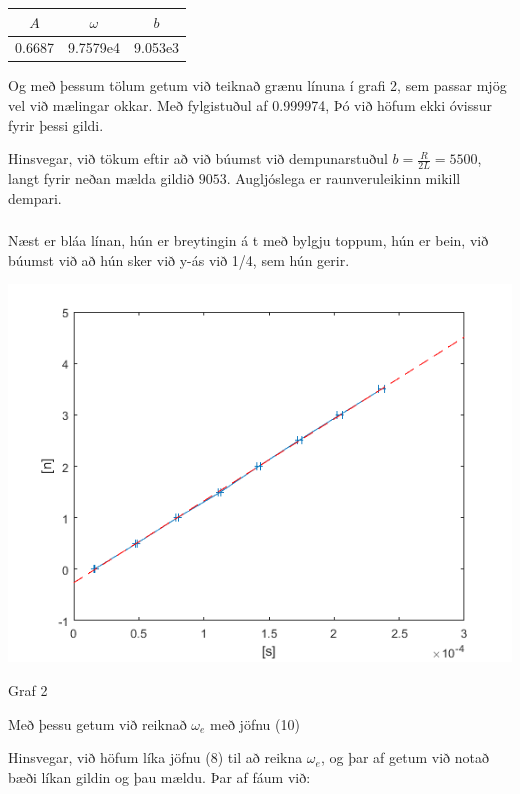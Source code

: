 \documentclass[12pt]{article}
\begin{document}
\begin{table}[H]
    \begin{tabular}{|c|c|c|}
		$ A $ 	& $ \omega $ 	& $ b $ \\
		\hline
		0.6687 	& 9.7579e4		& 9.053e3 \\
    \end{tabular}
\end{table}


Og með þessum tölum getum við teiknað grænu línuna í grafi 2, sem passar mjög vel við mælingar okkar. Með fylgistuðul af 0.999974, Þó við höfum ekki óvissur fyrir þessi gildi.

Hinsvegar, við tökum eftir að við búumst við dempunarstuðul $b=\frac{R}{2L}=5500$, langt fyrir neðan mælda gildið $9053$. Augljóslega er raunveruleikinn mikill dempari.

\subsubsection{}

Næst er bláa línan, hún er breytingin á t með bylgju toppum, hún er bein, við búumst við að hún sker við y-ás við 1/4, sem hún gerir.

\begin{center}
    \includegraphics[scale=0.7]{data_03.png}
    
	Graf 2
\end{center}


Með þessu getum við reiknað $\omega_e$ með jöfnu (10)

Hinsvegar, við höfum líka jöfnu (8) til að reikna $\omega_e$, og þar af getum við notað bæði líkan gildin og þau mældu. Þar af fáum við:
\end{document}

